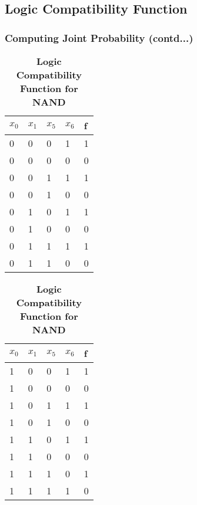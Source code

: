 \documentclass{beamer}
\begin{document}
\subsection{Logic Compatibility Function}
\begin{frame}
\frametitle{Computing Joint Probability (contd...)}
\begin{flushleft}
\begin{center}
\begin{table}{}
\begin{tabular}{|l|l|l|l|l|}
\hline
$x_0$ & $x_1$ & $x_5$ & $x_6$ & f \\ \hline
0 & 0 & 0 & 1 & 1 \\ \hline
0 & 0 & 0 & 0 & 0 \\ \hline
0 & 0 & 1 & 1 & 1 \\ \hline
0 & 0 & 1 & 0 & 0 \\ \hline
0 & 1 & 0 & 1 & 1 \\ \hline
0 & 1 & 0 & 0 & 0 \\ \hline
0 & 1 & 1 & 1 & 1 \\ \hline
0 & 1 & 1 & 0 & 0 \\ \hline
\end{tabular}
\hspace{3em}
\begin{tabular}{|l|l|l|l|l|}
\hline
$x_0$ & $x_1$ & $x_5$ & $x_6$ & f \\ \hline
1 & 0 & 0 & 1 & 1 \\ \hline
1 & 0 & 0 & 0 & 0 \\ \hline
1 & 0 & 1 & 1 & 1 \\ \hline
1 & 0 & 1 & 0 & 0 \\ \hline
1 & 1 & 0 & 1 & 1 \\ \hline
1 & 1 & 0 & 0 & 0 \\ \hline
1 & 1 & 1 & 0 & 1 \\ \hline
1 & 1 & 1 & 1 & 0 \\ \hline
\end{tabular}
\caption*{\textbf{Logic Compatibility Function for NAND}}
\end{table}
\end{center}
\end{flushleft}
\end{frame}
\end{document}
